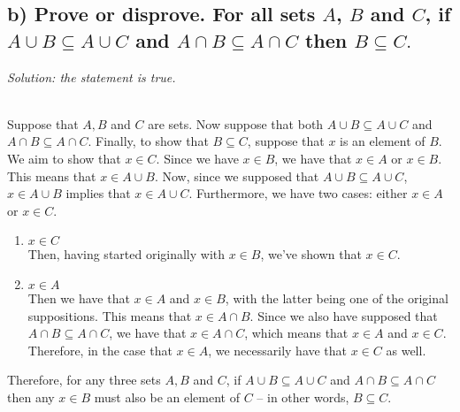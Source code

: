 \documentclass[11pt, letterpaper]{article}
\begin{document}
\subsection*{b) Prove or disprove. For all sets $A$, $B$ and $C$, if $A\cup B \subseteq A \cup C$ and $A\cap B \subseteq A \cap C$ then $B \subseteq C.$}
{\large\it Solution: the statement is true.}
\begin{prf}~\\
    Suppose that $A,B$ and $C$ are sets. Now suppose that both $A\cup B \subseteq A\cup C$ and $A\cap B \subseteq A\cap C$. Finally, to show that $B \subseteq C$, suppose that $x$ is an element of $B$. We aim to show that $x\in C$.
    Since we have $x\in B$, we have that $x\in A$ or $x\in B$. This means that $x\in A\cup B$. Now, since we supposed that  $A\cup B \subseteq A\cup C$, $x\in A\cup B$ implies that $x\in A\cup C$. Furthermore, we have two cases: either $x\in A$ or $x\in C$.
    \begin{enumerate}
        \item $x\in C$\\
            Then, having started originally with $x\in B$, we've shown that $x\in C$.
        \item $x\in A$\\
            Then we have that $x\in A$ and $x\in B$, with the latter being one of the original suppositions. This means that $x\in A\cap B$. Since we also have supposed that $A\cap B \subseteq A\cap C$, we have that $x\in A\cap C$, which means that $x\in A$ and $x\in C$.
            Therefore, in the case that $x\in A$, we necessarily have that $x\in C$ as well. 
    \end{enumerate}
    Therefore, for any three sets $A, B$ and $C$, if $A\cup B \subseteq A \cup C$ and $A\cap B \subseteq A \cap C$ then any $x\in B$ must also be an element of $C$ -- in other words, $B\subseteq C$. 
\end{prf}
\end{document}
